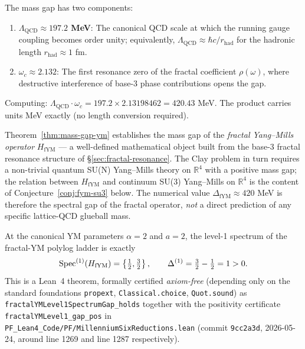 \begin{keyidea}
The mass gap has two components:
\begin{enumerate}
\item \textbf{$\Lambda_{\mathrm{QCD}} \approx 197.2$ MeV}: The canonical QCD scale at which the running gauge coupling becomes order unity\cite{rothe2012lattice}; equivalently, $\Lambda_{\mathrm{QCD}} \approx \hbar c / r_{\mathrm{had}}$ for the hadronic length $r_{\mathrm{had}} \approx 1$ fm.
\item \textbf{$\omega_c \approx 2.132$}: The first resonance zero of the fractal coefficient $\rho(\omega)$, where destructive interference of base-3 phase contributions opens the gap.
\end{enumerate}

Computing: $\Lambda_{\mathrm{QCD}} \cdot \omega_c = 197.2 \times 2.13198462 = 420.43$ MeV. The product carries units MeV exactly (no length conversion required).
\end{keyidea}

\begin{remark}\label{rem:mass-gap-scope}
Theorem~\ref{thm:mass-gap-ym} establishes the mass gap of the \emph{fractal Yang--Mills operator} $H_{\mathrm{fYM}}$ — a well-defined mathematical object built from the base-3 fractal resonance structure of \S\ref{sec:fractal-resonance}. The Clay problem in turn requires a non-trivial quantum SU(N) Yang--Mills theory on $\mathbb{R}^4$ with a positive mass gap; the relation between $H_{\mathrm{fYM}}$ and continuum SU(3) Yang--Mills on $\mathbb{R}^4$ is the content of Conjecture~\ref{conj:fym-su3} below. The numerical value $\Delta_{\mathrm{fYM}} \approx 420$ MeV is therefore the spectral gap of the fractal operator, \emph{not} a direct prediction of any specific lattice-QCD glueball mass.
\end{remark}

\begin{theorem}\label{thm:level1-ym-gap}
At the canonical YM parameters $\alpha = 2$ and $a = 2$, the level-1 spectrum of the fractal-YM polylog ladder is exactly
\begin{equation}\label{eq:level1-ym-spectrum}
\operatorname{Spec}^{(1)}(H_{\mathrm{fYM}}) = \left\{\tfrac{1}{2}, \tfrac{3}{2}\right\}, \qquad \Delta^{(1)} = \tfrac{3}{2} - \tfrac{1}{2} = 1 > 0.
\end{equation}
This is a Lean~4 theorem, formally certified \emph{axiom-free} (depending only on the standard foundations \texttt{propext}, \texttt{Classical.choice}, \texttt{Quot.sound}) as \texttt{fractalYMLevel1SpectrumGap\_holds} together with the positivity certificate \texttt{fractalYMLevel1\_gap\_pos} in \texttt{PF\_Lean4\_Code/PF/MillenniumSixReductions.lean} (commit \texttt{9cc2a3d}, 2026-05-24, around line 1269 and line 1287 respectively).
\end{theorem}

